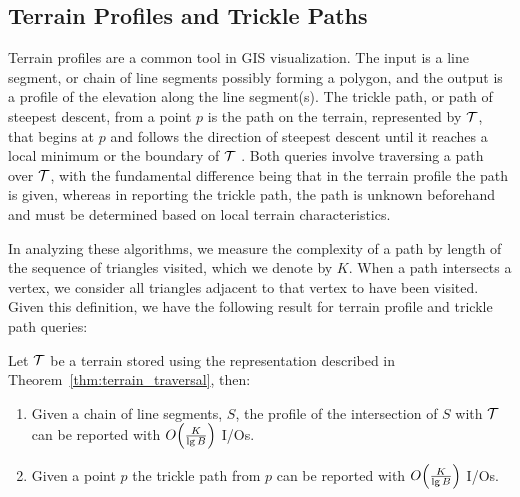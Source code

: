  \subsection{Terrain Profiles and Trickle Paths}\label{ssec:ter_profile_tpath}

  Terrain profiles are a common tool in GIS visualization. 
  The input is a line segment, or chain of line segments possibly forming a polygon, 
  and the output is a profile of the elevation along the line segment(s). 
  The trickle path, or path of steepest descent, from a point $p$ is the path on
  the terrain, represented by $\mathcal{T}$, 
  that begins at $p$ and follows the direction of steepest descent until it reaches 
  a local minimum or the boundary of $\mathcal{T}$ \cite{DBLP:conf/cccg/BergBDKOGRSY96}. 
  Both queries involve traversing a path over $\mathcal{T}$, with the fundamental 
  difference being that in the terrain profile the path is given, whereas in 
  reporting the trickle path, the path is unknown beforehand and must be 
  determined based on local terrain characteristics.

  In analyzing these algorithms, we measure the complexity of a path by length 
  of the sequence of triangles visited, which we denote by $K$. 
  When a path intersects a vertex, we consider all triangles adjacent to that 
  vertex to have been visited. 
  Given this definition, we have the following result for terrain profile and 
  trickle path queries:

  \begin{lemma}\label{lem:tprofile_tpath}
  Let $\mathcal{T}$ be a terrain stored using the representation described
  in Theorem~\ref{thm:terrain_traversal}, then:
  \begin{enumerate}[label={(\alph{*})}]
  \item{ Given a chain of line segments, $S$, the profile of the intersection 
  of $S$ with $\mathcal{T}$ can be reported with $O\!\left( \frac{K}{\lg{B}} \right)$ I/Os.}
  \item{ Given a point $p$ the trickle path from $p$ can be reported with 
  $O\!\left( \frac{K}{\lg{B}} \right)$ I/Os.}
  \end{enumerate}
  \end{lemma}

